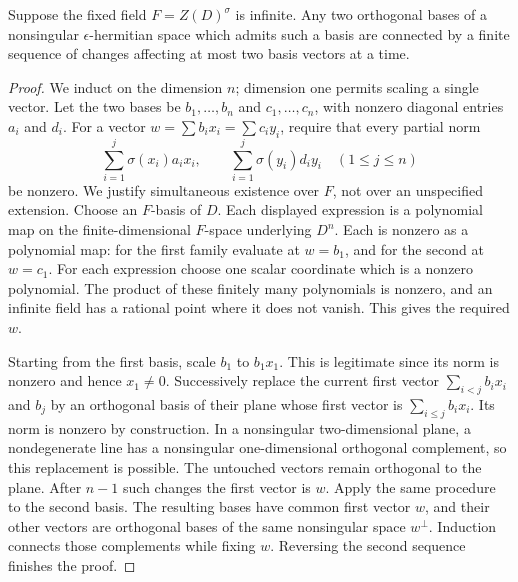\begin{lemma}
\label{C:division_binary_chain}
Suppose the fixed field $F=Z(D)^\sigma$ is infinite.
Any two orthogonal bases of a nonsingular $\epsilon$-hermitian
space which admits such a basis are connected by a finite sequence
of changes affecting at most two basis vectors at a time.
\end{lemma}
\begin{proof}
We induct on the dimension $n$; dimension one permits scaling a
single vector. Let the two bases be $b_1,\ldots,b_n$ and
$c_1,\ldots,c_n$, with nonzero diagonal entries $a_i$ and $d_i$.
For a vector $w=\sum b_i x_i=\sum c_i y_i$, require that every
partial norm
\[
 \sum_{i=1}^j\sigma(x_i)a_ix_i,
 \qquad \sum_{i=1}^j\sigma(y_i)d_iy_i
 \quad(1\leq j\leq n)
\]
be nonzero. We justify simultaneous existence over $F$, not over
an unspecified extension. Choose an $F$-basis of $D$.
Each displayed expression is a polynomial map on the finite-dimensional
$F$-space underlying $D^n$. Each is nonzero as a polynomial map:
for the first family evaluate at $w=b_1$, and for the second at
$w=c_1$. For each expression choose one scalar coordinate which
is a nonzero polynomial. The product of these finitely many
polynomials is nonzero, and an infinite field has a rational
point where it does not vanish. This gives the required $w$.

Starting from the first basis, scale $b_1$ to $b_1x_1$.
This is legitimate since its norm is nonzero and hence $x_1\ne0$.
Successively replace the current first vector
$\sum_{i<j}b_ix_i$ and $b_j$ by an orthogonal basis of their plane
whose first vector is $\sum_{i\leq j}b_ix_i$.
Its norm is nonzero by construction. In a nonsingular two-dimensional
plane, a nondegenerate line has a nonsingular one-dimensional
orthogonal complement, so this replacement is possible.
The untouched vectors remain orthogonal to the plane.
After $n-1$ such changes the first vector is $w$.
Apply the same procedure to the second basis. The resulting bases
have common first vector $w$, and their other vectors are orthogonal
bases of the same nonsingular space $w^\perp$.
Induction connects those complements while fixing $w$.
Reversing the second sequence finishes the proof.
\end{proof}


